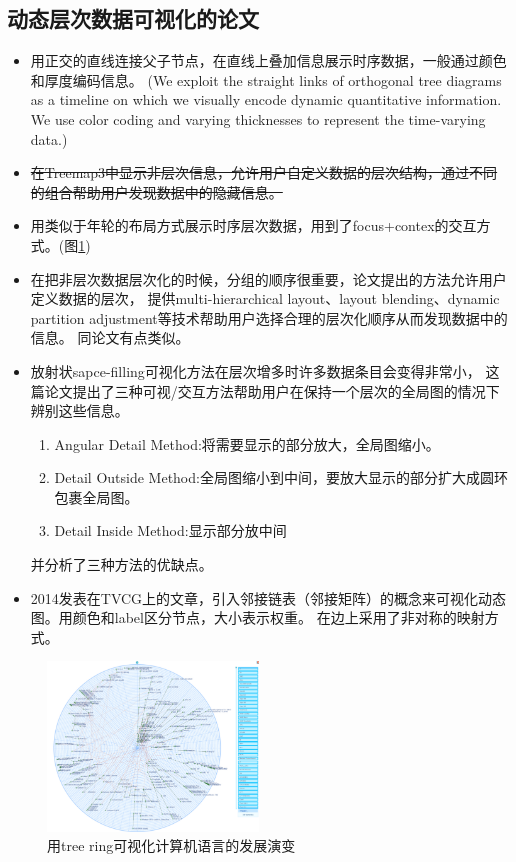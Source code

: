 \documentclass{article}
\begin{document}
\subsection{动态层次数据可视化的论文}
\begin{itemize}
	\item \cite{burch2011} 
		用正交的直线连接父子节点，在直线上叠加信息展示时序数据，一般通过颜色和厚度编码信息。
		(We exploit the straight links of orthogonal tree diagrams as a
		timeline on which we visually encode dynamic quantitative
		information.  We use color coding and varying thicknesses to
		represent the time-varying data.)
	\item \cite{sirin2002} {\sout{在Treemap3中显示非层次信息，允许用户自定义数据的层次结构，通过不同的组合帮助用户发现数据中的隐藏信息。}}

	\item \cite{theron2006hierarchical}用类似于年轮的布局方式展示时序层次数据，用到了focus+contex的交互方式。(图\ref{fig:tree_ring})

	\item \cite{wilson1999dynamic}在把非层次数据层次化的时候，分组的顺序很重要，论文提出的方法允许用户定义数据的层次，
		提供multi-hierarchical layout、layout blending、dynamic partition adjustment等技术帮助用户选择合理的层次化顺序从而发现数据中的信息。
		同论文\cite{sirin2002}有点类似。

	\item \cite{stasko2000focus}放射状sapce-filling可视化方法在层次增多时许多数据条目会变得非常小，
		这篇论文提出了三种可视/交互方法帮助用户在保持一个层次的全局图的情况下辨别这些信息。
		\begin{enumerate}
			\item Angular Detail Method:将需要显示的部分放大，全局图缩小。
			\item Detail Outside Method:全局图缩小到中间，要放大显示的部分扩大成圆环包裹全局图。
			\item Detail Inside Method:显示部分放中间
		\end{enumerate}
		并分析了三种方法的优缺点。
	\item \cite{TVCG2322594}2014发表在TVCG上的文章，引入邻接链表（邻接矩阵）的概念来可视化动态图。用颜色和label区分节点，大小表示权重。
		在边上采用了非对称的映射方式。
\end{itemize}
\begin{figure}[h]
	\centering
	\includegraphics[width=0.5\textwidth]{_img/tree_ring.png}
	\caption{用tree ring可视化计算机语言的发展演变}
	\label{fig:tree_ring}
\end{figure}
\end{document}
